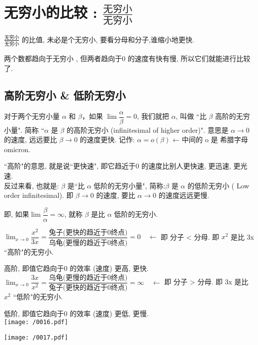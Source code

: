 \documentclass[UTF8]{ctexart}
\begin{document}
\section{无穷小的比较 : $ \frac{\text{无穷小}} {\text{无穷小}}$ }

$ \frac{\text{无穷小}} {\text{无穷小}}$ 的比值, 未必是个无穷小, 要看分母和分子,谁缩小地更快.  

两个数都趋向于无穷小 , 但两者趋向于0 的速度有快有慢, 所以它们就能进行比较了.




\subsection{ 高阶无穷小 \& 低阶无穷小} 

对于两个无穷小量 $\alpha$ 和 $\beta$，如果 $\lim \dfrac{\alpha} {\beta}=0$, 我们就把  $\alpha$, 叫做 ``比 $\beta$ 高阶的无穷小量". 简称 ``$\alpha$ 是 $\beta$ 的高阶无穷小  (infinitesimal of higher order)".  意思是 $\alpha \to 0$ 的速度, 远远要比 $\beta \to 0$ 的速度更快.  记作: $\alpha = o(\beta)$  ← 中间的 o 是 希腊字母 omicron.

``高阶"的意思, 就是说``更快速", 即它趋近于0 的速度比别人更快速, 更迅速, 更光速. \\

反过来看, 也就是:  $\beta$ 是``比 $\alpha$ 低阶的无穷小量", 简称:$\beta$ 是  $\alpha$ 的低阶无穷小 ( Low order infinitesimal). 即  $\beta \to 0$  的速度, 要比 $\alpha \to 0$  的速度远远更慢.

即, 如果$\lim \dfrac{\beta} {\alpha} = \infty$, 就称 $\beta$ 是比 $\alpha$ 低阶的无穷小.


\begin{tcolorbox}[title = {例},boxrule={0.1em},colframe={black!10}, colback={black!3},colbacktitle={black!10},coltitle={black}]
$ \lim_{x \to 0} \dfrac{x^2} {3x} = \dfrac{\text{兔子(更快的趋近于0终点)}} {\text{乌龟(更慢的趋近于0终点)}} = 0 \quad \gets $   即 分子 < 分母.  即 $x^2$ 是比 3x ``高阶"的无穷小.

高阶, 即值它趋向于0 的效率 (速度) 更高, 更快. \\


$ \lim_{x \to 0} \dfrac{3x} {x^2} = \dfrac{\text{乌龟(更慢的趋近于0终点)}} {\text{兔子(更快的趋近于0终点)}} = \infty \quad \gets $  即 分子 > 分母.  即 3x 是比 $x^2$ ``低阶"的无穷小. 

低阶, 即值它趋向于0 的效率 (速度) 更低, 更慢. \\

\texttt{[image: /0016.pdf]}

\texttt{[image: /0017.pdf]}
\end{tcolorbox}
\end{document}

